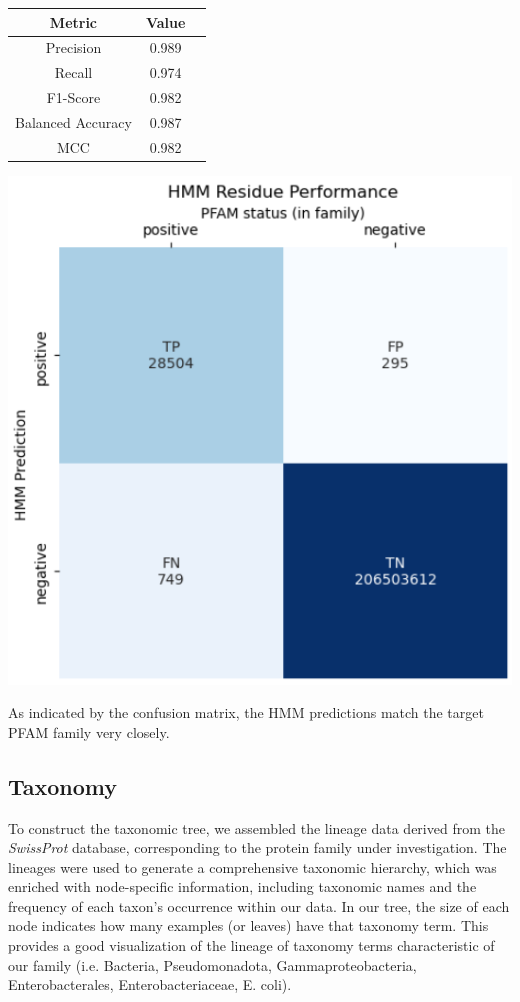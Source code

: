 \documentclass[10pt,twocolumn,letterpaper]{article}
\begin{document}
\begin{center}
    \begin{tabular}{ccc}
        \toprule
        Metric & Value \\
        \midrule
        Precision & 0.989 \\
        Recall & 0.974 \\
        F1-Score & 0.982 \\
        Balanced Accuracy & 0.987 \\
        MCC & 0.982 \\
        \bottomrule
    \end{tabular}
\end{center} 

\begin{center}
    \includegraphics[scale=0.45]{report/img/hmm_res_performance.png}
\end{center}

As indicated by the confusion matrix, the HMM predictions match the target PFAM family very closely.

\subsection{Taxonomy}

To construct the taxonomic tree, we assembled the lineage data derived from the \textit{SwissProt} database, corresponding to the protein family under investigation. The lineages were used to generate a comprehensive taxonomic hierarchy, which was enriched with node-specific information, including taxonomic names and the frequency of each taxon's occurrence within our data. In our tree, the size of each node indicates how many examples (or leaves) have that taxonomy term. This provides a good visualization of the lineage of taxonomy terms characteristic of our family (i.e. Bacteria, Pseudomonadota, Gammaproteobacteria, Enterobacterales, Enterobacteriaceae, E. coli).
\end{document}
